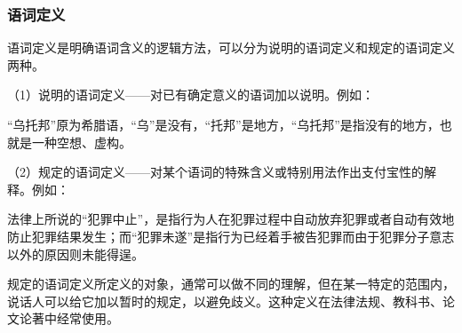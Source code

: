 \documentclass[
    a4paper,
    twoside
    ]{article}
\begin{document}
        \subsubsection{
            语词定义
        }
        {
            语词定义是明确语词含义的逻辑方法，可以分为说明的语词定义和规定的语词定义两种。

            （1）说明的语词定义——对已有确定意义的语词加以说明。例如：

            {
                \fangsong{}
                 ``乌托邦''原为希腊语，``乌''是没有，``托邦''是地方，``乌托邦''是指没有的地方，也就是一种空想、虚构。
            }

            （2）规定的语词定义——对某个语词的特殊含义或特别用法作出支付宝性的解释。例如：

            {
                \fangsong{}
                 法律上所说的``犯罪中止''，是指行为人在犯罪过程中自动放弃犯罪或者自动有效地防止犯罪结果发生；而``犯罪未遂''是指行为已经着手被告犯罪而由于犯罪分子意志以外的原因则未能得逞。
            }

            规定的语词定义所定义的对象，通常可以做不同的理解，但在某一特定的范围内，说话人可以给它加以暂时的规定，以避免歧义。这种定义在法律法规、教科书、论文论著中经常使用。

        }
\end{document}
